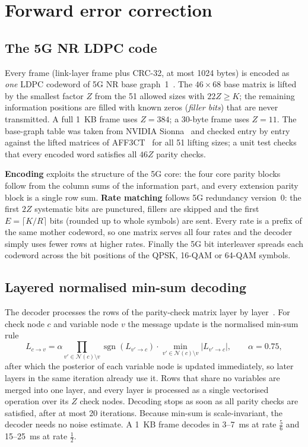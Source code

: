 \documentclass[11pt,a4paper,oneside]{report}
\begin{document}
\section{Forward error correction}\label{sec:ldpc}

\subsection{The 5G NR LDPC code}
Every frame (link-layer frame plus CRC-32, at most \num{1024} bytes) is encoded
as \emph{one} LDPC codeword of 5G NR base graph~1~\cite{ts38212}. The $46\times68$ base matrix is
lifted by the smallest factor $Z$ from the 51 allowed sizes with $22Z\ge K$; the remaining
information positions are filled with known zeros (\emph{filler bits}) that are never transmitted.
A full \SI{1}{KB} frame uses $Z=384$; a 30-byte frame uses $Z=11$. The base-graph table
was taken from NVIDIA Sionna~\cite{sionna} and checked entry by entry against the lifted matrices of
AFF3CT~\cite{aff3ct} for all 51 lifting sizes; a unit test checks that every encoded word satisfies all
$46Z$ parity checks.

\textbf{Encoding} exploits the structure of the 5G core: the four core parity blocks follow from
the column sums of the information part, and every extension parity block is a single row sum.
\textbf{Rate matching} follows 5G redundancy version~0: the first $2Z$ systematic bits are punctured,
fillers are skipped and the first $E=\lceil K/R\rceil$ bits (rounded up to whole symbols) are sent.
Every rate is a prefix of the same mother codeword, so one matrix serves all four rates and the
decoder simply uses fewer rows at higher rates. Finally the 5G bit interleaver spreads each codeword
across the bit positions of the QPSK, 16-QAM or 64-QAM symbols.

\subsection{Layered normalised min-sum decoding}
The decoder processes the rows of the parity-check matrix layer by layer~\cite{hocevar2004}. For check
node $c$ and variable node $v$ the message update is the normalised min-sum rule~\cite{chen2002}
\begin{equation}
  L_{c\to v}=\alpha\prod_{v'\in\mathcal{N}(c)\setminus v}\operatorname{sgn}\!\left(L_{v'\to c}\right)\cdot
  \min_{v'\in\mathcal{N}(c)\setminus v}\left|L_{v'\to c}\right|,\qquad \alpha=0.75 ,
\end{equation}
after which the posterior of each variable node is updated immediately, so later layers in the same
iteration already use it. Rows that share no variables are merged into one layer, and every layer is
processed as a single vectorised operation over its $Z$ check nodes. Decoding stops as soon as all
parity checks are satisfied, after at most 20 iterations. Because min-sum is scale-invariant, the
decoder needs no noise estimate. A \SI{1}{KB} frame decodes in 3--\SI{7}{ms} at rate $\tfrac56$ and
15--\SI{25}{ms} at rate $\tfrac12$.
\end{document}
